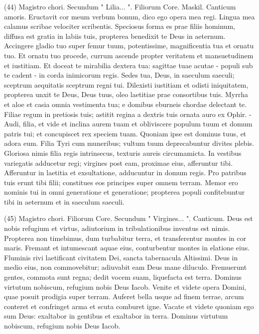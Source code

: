 \begin{biblechapter}  (44) 
\verse  Magistro chori. Secundum " Lilia... ". Filiorum Core. Maskil. Canticum amoris. 
\verse Eructavit cor meum verbum bonum, dico ego opera mea regi. Lingua mea calamus scribae velociter scribentis. 
\verse Speciosus forma es prae filiis hominum, diffusa est gratia in labiis tuis, propterea benedixit te Deus in aeternum. 
\verse Accingere gladio tuo super femur tuum, potentissime, magnificentia tua et ornatu tuo. 
\verse Et ornatu tuo procede, currum ascende propter veritatem et mansuetudinem et iustitiam. Et doceat te mirabilia dextera tua: 
\verse sagittae tuae acutae - populi sub te cadent - in corda inimicorum regis. 
\verse Sedes tua, Deus, in saeculum saeculi; sceptrum aequitatis sceptrum regni tui. 
\verse Dilexisti iustitiam et odisti iniquitatem, propterea unxit te Deus, Deus tuus, oleo laetitiae prae consortibus tuis. 
\verse Myrrha et aloe et casia omnia vestimenta tua; e domibus eburneis chordae delectant te. 
\verse Filiae regum in pretiosis tuis; astitit regina a dextris tuis ornata auro ex Ophir. - 
\verse Audi, filia, et vide et inclina aurem tuam et obliviscere populum tuum et domum patris tui; 
\verse et concupiscet rex speciem tuam. Quoniam ipse est dominus tuus, et adora eum. 
\verse Filia Tyri cum muneribus; vultum tuum deprecabuntur divites plebis. 
\verse Gloriosa nimis filia regis intrinsecus, texturis aureis circumamicta. 
\verse In vestibus variegatis adducetur regi; virgines post eam, proximae eius, afferuntur tibi. 
\verse Afferuntur in laetitia et exsultatione, adducuntur in domum regis. 
\verse Pro patribus tuis erunt tibi filii; constitues eos principes super omnem terram. 
\verse Memor ero nominis tui in omni generatione et generatione; propterea populi confitebuntur tibi in aeternum et in saeculum saeculi. 
\end{biblechapter}

\begin{biblechapter}  (45) 
\verse  Magistro chori. Filiorum Core. Secundum " Virgines... ". Canticum. 
\verse Deus est nobis refugium et virtus, adiutorium in tribulationibus inventus est nimis. 
\verse Propterea non timebimus, dum turbabitur terra, et transferentur montes in cor maris. 
\verse Fremant et intumescant aquae eius, conturbentur montes in elatione eius. 
\verse Fluminis rivi laetificant civitatem Dei, sancta tabernacula Altissimi. 
\verse Deus in medio eius, non commovebitur; adiuvabit eam Deus mane diluculo. 
\verse Fremuerunt gentes, commota sunt regna; dedit vocem suam, liquefacta est terra. 
\verse Dominus virtutum nobiscum, refugium nobis Deus Iacob. 
\verse Venite et videte opera Domini, quae posuit prodigia super terram. Auferet bella usque ad finem terrae, 
\verse arcum conteret et confringet arma et scuta comburet igne. 
\verse Vacate et videte quoniam ego sum Deus: exaltabor in gentibus et exaltabor in terra. 
\verse Dominus virtutum nobiscum, refugium nobis Deus Iacob. 
\end{biblechapter}

